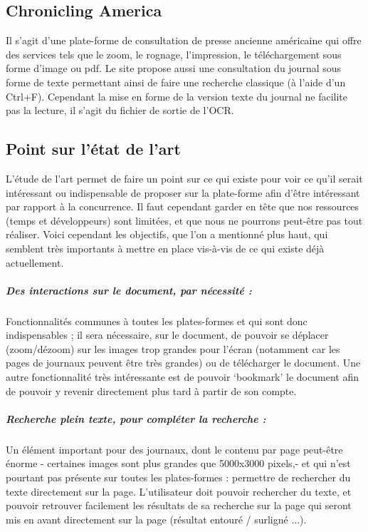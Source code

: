         \subsection{Chronicling America}
        \label{subsec:chrinamerica}
        Il s'agit d'une plate-forme de consultation de presse ancienne américaine qui offre des services
        tels que le zoom, le rognage, l’impression, le téléchargement sous forme d’image ou pdf. Le site propose
        aussi une consultation du journal sous forme de texte permettant ainsi de faire une recherche classique
        (à l’aide d’un Ctrl+F). Cependant la mise en forme de la version texte du journal ne facilite pas la lecture,
        il s'agit du fichier de sortie de l'OCR.


    \subsection{Point sur l’état de l’art}
    \label{sec:point}
    L’étude de l’art permet de faire un point sur ce qui existe pour voir ce qu’il serait intéressant
    ou indispensable de proposer sur la plate-forme afin d’être intéressant par rapport à la concurrence.
    Il faut cependant garder en tête que nos ressources (temps et développeurs) sont limitées, et que nous
    ne pourrons peut-être pas tout réaliser. Voici cependant les objectifs, que l’on a mentionné plus haut,
    qui semblent très importants à mettre en place vis-à-vis de ce qui existe déjà actuellement.

    \subparagraph{Des interactions sur le document, par nécessité :}
    Fonctionnalités communes à toutes les plates-formes et qui sont donc indispensables ; il sera nécessaire,
    sur le document, de pouvoir se déplacer (zoom/dézoom) sur les images trop grandes pour l’écran (notamment
    car les pages de journaux peuvent être très grandes) ou de télécharger le document. Une autre fonctionnalité
    très intéressante est de pouvoir ‘bookmark’ le document afin de pouvoir y revenir directement plus tard à partir de son compte.

    \subparagraph{Recherche plein texte, pour compléter la recherche :}
    Un élément important pour des journaux, dont le contenu par page peut-être énorme - certaines images sont plus
    grandes que 5000x3000 pixels,- et qui n’est pourtant pas présente sur toutes les plates-formes : permettre
    de rechercher du texte directement sur la page. L’utilisateur doit pouvoir rechercher du texte, et pouvoir
    retrouver facilement les résultats de sa recherche sur la page qui seront mis en avant directement
    sur la page (résultat entouré / surligné ...).


